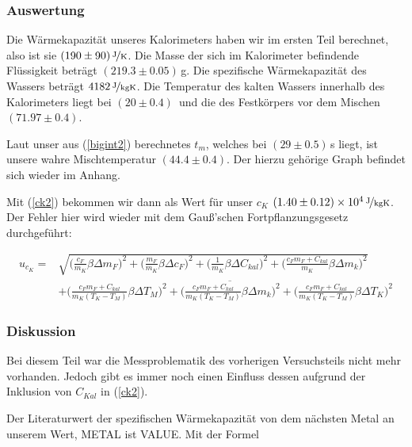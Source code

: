 \documentclass[11pt,a4paper]{article}
\begin{document}
\subsubsection{Auswertung}

Die W\"armekapazit\"at unseres Kalorimeters haben wir im ersten Teil berechnet, also ist sie $(190\pm90)\,\nicefrac{\mathrm{J}}{\mathrm{K}}$. Die Masse der sich im Kalorimeter befindende Fl\"ussigkeit betr\"agt $(219.3\pm0.05)$\,g. Die spezifische W\"armekapazit\"at des Wassers betr\"agt $4182\,\nicefrac{\mathrm{J}}{\mathrm{kgK}}$. Die Temperatur des kalten Wassers innerhalb des Kalorimeters liegt bei $(20\pm0.4)$\celsius\ und die des Festk\"orpers vor dem Mischen $(71.97\pm0.4)$\celsius.

Laut unser aus (\ref{bigint2}) berechnetes $t_m$, welches bei $(29\pm0.5)$\,s liegt, ist unsere wahre Mischtemperatur $(44.4\pm0.4)$\celsius. Der hierzu geh\"orige Graph befindet sich wieder im Anhang.

Mit (\ref{ck2}) bekommen wir dann als Wert f\"ur unser $c_K$ $(1.40\pm0.12)\times10^4\,\nicefrac{\mathrm{J}}{\mathrm{kgK}}$. Der Fehler hier wird wieder mit dem Gau\ss 'schen Fortpflanzungsgesetz durchgef\"uhrt:

\color{purple}

\begin{align*}
 	u_{c_K} = &\sqrt{\bigg(\frac{c_F}{m_K} \beta \Delta m_F\bigg)^2 + \bigg( \frac{m_F}{m_K} \beta \Delta c_F\bigg)^2 + \bigg( \frac{1}{m_K} \beta \Delta C_{kal}\bigg)^2 + \bigg( \frac{c_F m_F + C_{kal}}{m_K} \beta \Delta m_k\bigg)^2}\\
 	& + \overline{\bigg( \frac{c_F m_F + C_{kal}}{m_K (T_K - T_M)} \beta \Delta T_M \bigg)^2 + \bigg( \frac{c_F m_F + C_{kal}}{m_K (T_K - T_M)} \beta \Delta m_k\bigg)^2 + \bigg( \frac{c_F m_F + C_{kal}}{m_K (T_K - T_M)} \beta \Delta T_K \bigg)^2}
\end{align*}

\color{black}

\subsubsection{Diskussion}

Bei diesem Teil war die Messproblematik des vorherigen Versuchsteils nicht mehr vorhanden. Jedoch gibt es immer noch einen Einfluss dessen aufgrund der Inklusion von $C_{Kal}$ in (\ref{ck2}).

Der Literaturwert der spezifischen W\"armekapazit\"at von dem n\"achsten Metal an unserem Wert, METAL ist VALUE. Mit der Formel
\end{document}
